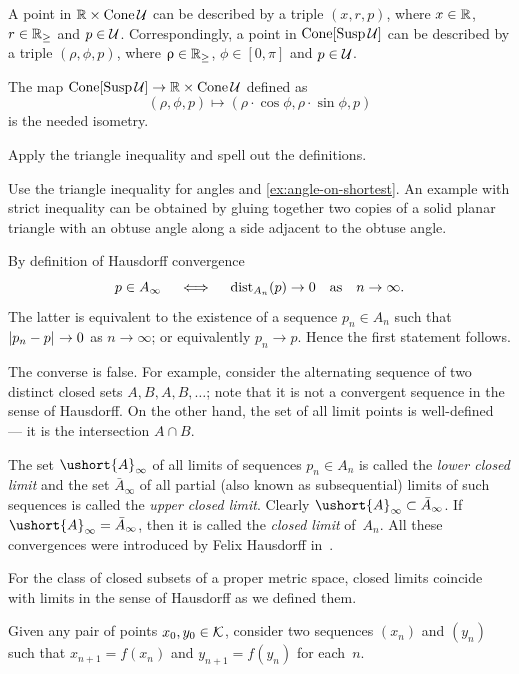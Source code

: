  A point in $\RR\times \Cone \spc{U}$ can be described by a triple $(x,r,p)$, where $x\in \RR$, $r\in \RR_{\ge}$ and $p\in \spc{U}$.
Correspondingly, a point in $\mathop{\rm Cone}\nolimits[\mathop{\rm Susp}\nolimits\mathcal{U}]$ can be described by a triple $(\rho,\phi,p)$, where $\rho\in \RR_\ge$, $\phi\in [0,\pi]$ and $p\in \spc{U}$.

The map 
$\Cone[\Susp\spc{U}]\to\RR\times\Cone\spc{U}$ defined as
\[(\rho,\phi,p)\mapsto(\rho\cdot\cos\phi,\rho\cdot\sin\phi,p)\] 
is the needed isometry.


 Apply the triangle inequality and spell out the definitions.

Use the triangle inequality for angles and \ref{ex:angle-on-shortest}.
An example with strict inequality can be obtained by gluing together two copies of a solid planar triangle with an obtuse angle along a side adjacent to the obtuse angle.

By definition of Hausdorff convergence
\[p\in A_\infty\quad\iff\quad\distfun_{A_n}(p)\to 0\quad\text{as}\quad n\to \infty.\] 
The latter is equivalent to the existence of a sequence $p_n\in A_n$ such that
$\dist{p_n}{p}{}\to0$ as $n\to \infty$;
or equivalently $p_n\to p$.
Hence the first statement follows.

The converse is false.
For example, consider the alternating sequence of two distinct closed sets $A,B,A,B,\ldots$;
note that it is not a convergent sequence in the sense of Hausdorff.
On the other hand, the set of all limit points is well-defined --- it is the intersection $A\cap B$.

 The set $\ushort{A}_\infty$ of all limits of sequences $p_n\in A_n$ is called the \emph{lower closed limit}
and the set $\bar{A}_\infty$ of all partial (also known as subsequential) limits of such sequences is called the \emph{upper closed limit}.
Clearly $\ushort{A}_\infty\subset \bar{A}_\infty$.
If $\ushort{A}_\infty=\bar{A}_\infty$, then it is called the \emph{closed limit} of~$A_n$.
All these convergences were introduced by Felix Hausdorff in~\cite{hausdorff}.

For the class of closed subsets of a proper metric space, closed limits coincide with limits in the sense of Hausdorff as we defined them.


Given any pair of points $x_0,y_0\in \spc{K}$, 
consider two sequences $(x_n)$ and $(y_n)$
such that 
$x_{n+1}=f(x_n)$ and $y_{n+1}=f(y_n)$ for each~$n$.

